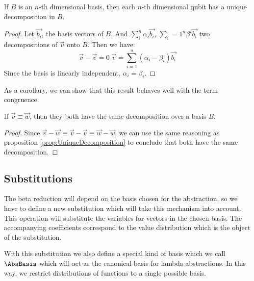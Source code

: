 \begin{proposition}\label{prop:UniqueDecomposition}
  If $B$ is an $n$-th dimensional basis, then each $n$-th dimensional qubit has a unique decomposition in $B$.
\end{proposition}

\begin{proof}
  Let $\vec{b_i}$, the basis vectors of $B$. And $\sum_i^n\alpha_i \vec{b_i}$, $\sum_i=1^n \beta^i \vec{b_i}$ two decompositions of $\vec{v}$ onto $B$. Then we have:
  \[\vec{v} - \vec{v} = 0 \; \vec{v} = \sum_{i=1}^{n} (\alpha_i - \beta_i) \vec{b_i}\]
  Since the basis is linearly independent, $\alpha_i = \beta_i$.
\end{proof}

As a corollary, we can show that this result behaves well with the term congruence.

\begin{corollary}\label{cor:EquivalentDecomposition}
  If $\vec{v}\equiv\vec{w}$, then they both have the same decomposition over a basis $B$.
\end{corollary}
\begin{proof}
  Since $\vec{v} - \vec{w} \equiv \vec{v} - \vec{v} \equiv \vec{w} - \vec{w}$, we can use the same reasoning as proposition \ref{prop:UniqueDecomposition} to conclude that both have the same decomposition.
\end{proof}

\subsection{Substitutions}

The beta reduction will depend on the basis chosen for the abstraction, so we have to define a new substitution which will take this mechanism into account. This operation will substitute the variables for vectors in the chosen basis. The accompanying coefficients correspond to the value distribution which is the object of the substitution.
  
With this substitution we also define a special kind of basis which we call $\AbsBasis$ which will act as the canonical basis for lambda abstractions. In this way, we restrict distributions of functions to a single possible basis.

